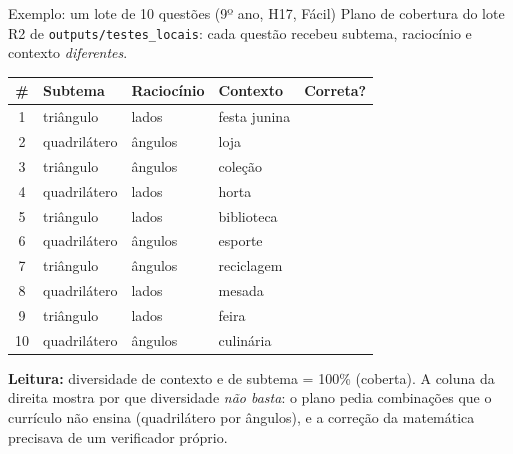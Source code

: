 \documentclass[aspectratio=169,11pt]{beamer}
\newcommand{\okmark}{{\color{okgreen}\faCheckCircle}}
\newcommand{\badmark}{{\color{badred}\faTimesCircle}}
\begin{document}
\begin{frame}{Exemplo: um lote de 10 questões (9º ano, H17, Fácil)}
  \footnotesize
  Plano de cobertura do lote R2 de \texttt{outputs/testes\_locais}: cada questão recebeu subtema, raciocínio e contexto \emph{diferentes}.

  \vspace{3pt}
  \begin{tabularx}{\textwidth}{@{}c l l l c@{}}
    \toprule
    \textbf{\#} & \textbf{Subtema} & \textbf{Raciocínio} & \textbf{Contexto} & \textbf{Correta?} \\
    \midrule
    1  & triângulo     & lados     & festa junina   & \okmark \\
    2  & quadrilátero  & ângulos   & loja           & \badmark \\
    3  & triângulo     & ângulos   & coleção        & \badmark \\
    4  & quadrilátero  & lados     & horta          & \badmark \\
    5  & triângulo     & lados     & biblioteca     & \okmark \\
    6  & quadrilátero  & ângulos   & esporte        & \badmark \\
    7  & triângulo     & ângulos   & reciclagem     & \badmark \\
    8  & quadrilátero  & lados     & mesada         & \badmark \\
    9  & triângulo     & lados     & feira          & \okmark \\
    10 & quadrilátero  & ângulos   & culinária      & \badmark \\
    \bottomrule
  \end{tabularx}

  \vspace{4pt}
  \begin{tcolorbox}[colback=lightblue, colframe=accentblue, boxrule=0.4pt, arc=2pt, left=4pt, right=4pt, top=2pt, bottom=2pt]
    \scriptsize \textbf{Leitura:} diversidade de contexto e de subtema = 100\% (coberta). A coluna da direita mostra por que diversidade \emph{não basta}: o plano pedia combinações que o currículo não ensina (quadrilátero por ângulos), e a correção da matemática precisava de um verificador próprio.
  \end{tcolorbox}
\end{frame}
\end{document}
